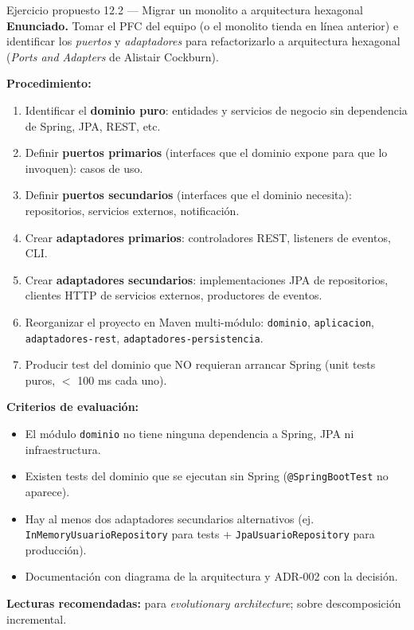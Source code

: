 \begin{cajaejercicio}{Ejercicio propuesto 12.2 --- Migrar un monolito a arquitectura hexagonal}
\textbf{Enunciado.} Tomar el PFC del equipo (o el monolito tienda en
línea anterior) e identificar los \emph{puertos} y \emph{adaptadores}
para refactorizarlo a arquitectura hexagonal (\emph{Ports and
Adapters} de Alistair Cockburn).

\textbf{Procedimiento:}
\begin{enumerate}
\item Identificar el \textbf{dominio puro}: entidades y servicios
de negocio sin dependencia de Spring, JPA, REST, etc.
\item Definir \textbf{puertos primarios} (interfaces que el dominio
expone para que lo invoquen): casos de uso.
\item Definir \textbf{puertos secundarios} (interfaces que el dominio
necesita): repositorios, servicios externos, notificación.
\item Crear \textbf{adaptadores primarios}: controladores REST,
listeners de eventos, CLI.
\item Crear \textbf{adaptadores secundarios}: implementaciones JPA
de repositorios, clientes HTTP de servicios externos, productores de
eventos.
\item Reorganizar el proyecto en Maven multi-módulo:
\texttt{dominio}, \texttt{aplicacion}, \texttt{adaptadores-rest},
\texttt{adaptadores-persistencia}.
\item Producir test del dominio que NO requieran arrancar Spring
(unit tests puros, $<$ 100 ms cada uno).
\end{enumerate}

\textbf{Criterios de evaluación:}
\begin{itemize}
\item El módulo \texttt{dominio} no tiene ninguna dependencia a
Spring, JPA ni infraestructura.
\item Existen tests del dominio que se ejecutan sin Spring
(\texttt{@SpringBootTest} no aparece).
\item Hay al menos dos adaptadores secundarios alternativos
(ej. \texttt{InMemoryUsuarioRepository} para tests +
\texttt{JpaUsuarioRepository} para producción).
\item Documentación con diagrama de la arquitectura y ADR-002 con la
decisión.
\end{itemize}

\textbf{Lecturas recomendadas:} \cite{ford2017building} para
\emph{evolutionary architecture}; \cite{newman2021building} sobre
descomposición incremental.
\end{cajaejercicio}

